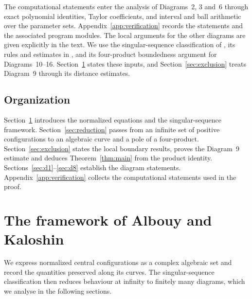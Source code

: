 \documentclass[Threeside,11pt]{article}
\theoremstyle{definition}
\theoremstyle{remark}
\numberwithin{equation}{section}
\theoremstyle{remark}
\begin{document}
The computational statements enter the analysis of Diagrams~2, 3 and~6 through
exact polynomial identities, Taylor coefficients, and interval and ball
arithmetic over the parameter sets. Appendix~\ref{app:verification} records
the statements and the associated program modules. The local arguments for
the other diagrams are given explicitly in the text. We use the
singular-sequence classification of \cite[Fig.~11]{AK}, its rules and estimates
in \cite[\S3]{AK}, and its four-product boundedness argument for
Diagrams~10--16. Section~\ref{sec:ak} states these inputs, and
Section~\ref{sec:exclusion} treats Diagram~9 through its distance estimates.

\subsection*{Organization}
Section~\ref{sec:ak} introduces the normalized equations and the
singular-sequence framework. Section~\ref{sec:reduction} passes from an infinite
set of positive configurations to an algebraic curve and a pole of a
four-product. Section~\ref{sec:exclusion} states the local boundary results,
proves the Diagram~9 estimate and deduces Theorem~\ref{thm:main} from the product
identity. Sections~\ref{sec:d1}--\ref{sec:d8} establish the diagram statements.
Appendix~\ref{app:verification} collects the computational statements used in
the proof.


\section{The framework of Albouy and Kaloshin}\label{sec:ak}

We express normalized central configurations as a complex algebraic set and record the
quantities preserved along its curves.  The singular-sequence classification then reduces
behaviour at infinity to finitely many diagrams, which we analyse in the following sections.
\end{document}
